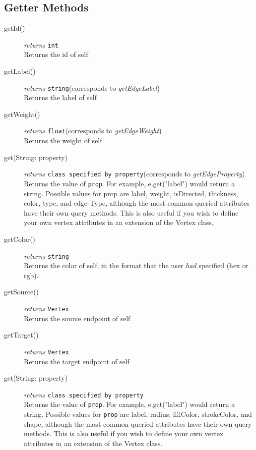\subsection{Getter Methods}
\begin{description}
\item[getId()] \emph{returns} \texttt{int}\\
Returns the id of self

\label{getEdgeLabelClass}\item[getLabel()] \emph{returns} \texttt{string}\quad(corresponds to \textit{getEdgeLabel})\\
Returns the label of self

\label{getEdgeWeightClass}\item[getWeight()] \emph{returns} \texttt{float}\quad(corresponds to \textit{getEdgeWeight})
\\
Returns the weight of self


\label{getEdgePropertyClass}\item[get(String: property)] \emph{returns} \texttt{class specified by property}\quad(corresponds to \textit{getEdgeProperty})\\
Returns the value of \texttt{prop}. For example, e.get("label") would return a string. Possible values for prop are label, weight, isDirected, thickness, color, type, and edge-Type, although the most common queried attributes have their own query methods. This is also useful if you wish to define your own vertex attributes in an extension of the Vertex class.

\item[getColor()] \emph{returns} \texttt{string}\\
Returns the color of self, in the format that the user \textit{had} specified (hex or rgb).

\item[getSource()] \emph{returns} \texttt{Vertex}\\
Returns the source endpoint of self

\item[getTarget()] \emph{returns} \texttt{Vertex}\\
Returns the target endpoint of self

\item[get(String: property)] \emph{returns} \texttt{class specified by property}\\
Returns the value of \texttt{prop}. For example, e.get("label") would return a string. Possible values for \texttt{prop} are label, radius, fillColor, strokeColor, and shape, although the most common queried attributes have their own query methods. This is also useful if you wish to define your own vertex attributes in an extension of the Vertex class.


\end{description}
